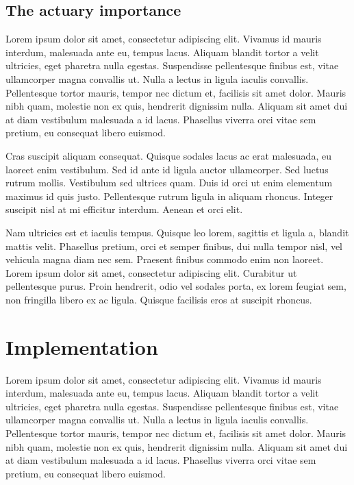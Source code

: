 \documentclass[a4paper, nobind]{templates/ociamthesis}
\theoremstyle{definition}
\theoremstyle{definition}
\theoremstyle{definition}
\theoremstyle{remark}
\begin{document}
\hypertarget{chap:actuary-importance}{%
\subsection{The actuary importance}\label{chap:actuary-importance}}

Lorem ipsum dolor sit amet, consectetur adipiscing elit. Vivamus id mauris interdum, malesuada ante eu, tempus lacus. Aliquam blandit tortor a velit ultricies, eget pharetra nulla egestas. Suspendisse pellentesque finibus est, vitae ullamcorper magna convallis ut. Nulla a lectus in ligula iaculis convallis. Pellentesque tortor mauris, tempor nec dictum et, facilisis sit amet dolor. Mauris nibh quam, molestie non ex quis, hendrerit dignissim nulla. Aliquam sit amet dui at diam vestibulum malesuada a id lacus. Phasellus viverra orci vitae sem pretium, eu consequat libero euismod.

Cras suscipit aliquam consequat. Quisque sodales lacus ac erat malesuada, eu laoreet enim vestibulum. Sed id ante id ligula auctor ullamcorper. Sed luctus rutrum mollis. Vestibulum sed ultrices quam. Duis id orci ut enim elementum maximus id quis justo. Pellentesque rutrum ligula in aliquam rhoncus. Integer suscipit nisl at mi efficitur interdum. Aenean et orci elit.

Nam ultricies est et iaculis tempus. Quisque leo lorem, sagittis et ligula a, blandit mattis velit. Phasellus pretium, orci et semper finibus, dui nulla tempor nisl, vel vehicula magna diam nec sem. Praesent finibus commodo enim non laoreet. Lorem ipsum dolor sit amet, consectetur adipiscing elit. Curabitur ut pellentesque purus. Proin hendrerit, odio vel sodales porta, ex lorem feugiat sem, non fringilla libero ex ac ligula. Quisque facilisis eros at suscipit rhoncus.

\hypertarget{chap:implementation}{%
\section{Implementation}\label{chap:implementation}}

Lorem ipsum dolor sit amet, consectetur adipiscing elit. Vivamus id mauris interdum, malesuada ante eu, tempus lacus. Aliquam blandit tortor a velit ultricies, eget pharetra nulla egestas. Suspendisse pellentesque finibus est, vitae ullamcorper magna convallis ut. Nulla a lectus in ligula iaculis convallis. Pellentesque tortor mauris, tempor nec dictum et, facilisis sit amet dolor. Mauris nibh quam, molestie non ex quis, hendrerit dignissim nulla. Aliquam sit amet dui at diam vestibulum malesuada a id lacus. Phasellus viverra orci vitae sem pretium, eu consequat libero euismod.
\end{document}
